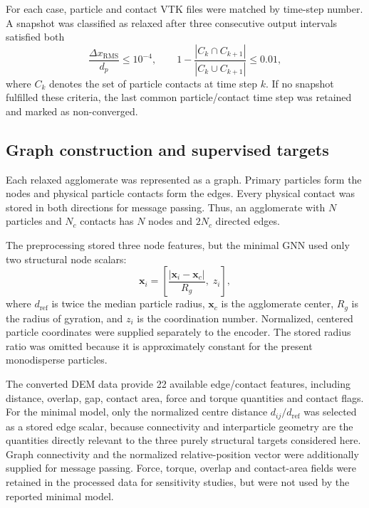 For each case, particle and contact VTK files were matched by time-step number.
A snapshot was classified as relaxed after three consecutive output intervals
satisfied both
\begin{equation}
 \frac{\Delta x_{\mathrm{RMS}}}{d_p}\leq 10^{-4},
 \qquad
 1-\frac{|C_k\cap C_{k+1}|}{|C_k\cup C_{k+1}|}\leq 0.01,
\end{equation}
where $C_k$ denotes the set of particle contacts at time step $k$. If no
snapshot fulfilled these criteria, the last common particle/contact time step
was retained and marked as non-converged.

\subsection{Graph construction and supervised targets}

Each relaxed agglomerate was represented as a graph. Primary particles form
the nodes and physical particle contacts form the edges. Every physical contact
was stored in both directions for message passing. Thus, an agglomerate with
$N$ particles and $N_c$ contacts has $N$ nodes and $2N_c$ directed edges.

The preprocessing stored three node features, but the minimal GNN used only
two structural node scalars:
\begin{equation}
 \boldsymbol{x}_i=
 \left[
   \frac{|\boldsymbol{x}_i-\boldsymbol{x}_c|}{R_g},\;
   z_i
 \right],
\end{equation}
where $d_{\mathrm{ref}}$ is twice the median particle radius,
$\boldsymbol{x}_c$ is the agglomerate center, $R_g$ is the radius of gyration,
and $z_i$ is the coordination number. Normalized, centered particle coordinates
were supplied separately to the encoder. The stored radius ratio was omitted
because it is approximately constant for the present monodisperse particles.

The converted DEM data provide 22 available edge/contact features, including
distance, overlap, gap, contact area, force and torque quantities and contact
flags. For the minimal model, only the normalized centre distance
$d_{ij}/d_{\mathrm{ref}}$ was selected as a stored edge scalar, because
connectivity and interparticle geometry are the quantities directly relevant
to the three purely structural targets considered here. Graph connectivity
and the normalized relative-position vector were additionally supplied for
message passing. Force, torque, overlap and contact-area fields were retained
in the processed data for sensitivity studies, but were not used by the
reported minimal model.

